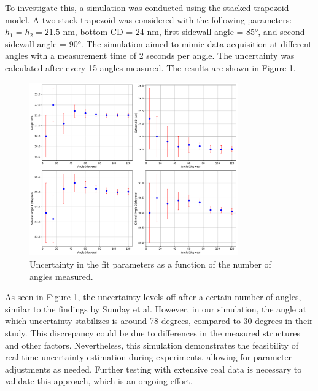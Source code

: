 To investigate this, a simulation was conducted using the stacked trapezoid model. A two-stack 
trapezoid was considered with the following parameters: \( h_{1} = h_{2} = 21.5 \) nm, bottom CD = 24 nm, 
first sidewall angle = 85°, and second sidewall angle = 90°. The simulation aimed to mimic 
data acquisition at different angles with a measurement time of 2 seconds per angle. The uncertainty 
was calculated after every 15 angles measured. The results are shown in Figure \ref{fig:uncertainity}.

\begin{figure}[h]
\centering
\includegraphics[width=0.8\textwidth]{images/uncertainity.png}
\caption{Uncertainty in the fit parameters as a function of the number of angles measured.}
\label{fig:uncertainity}
\end{figure}

As seen in Figure \ref{fig:uncertainity}, the uncertainty levels off after a certain number of angles, similar to the findings by Sunday et al.
However, in our simulation, the angle at which uncertainty stabilizes is around 78 degrees, 
compared to 30 degrees in their study. This discrepancy could be due to differences in the measured
structures and other factors. Nevertheless, this simulation demonstrates the feasibility of real-time 
uncertainty estimation during experiments, allowing for parameter adjustments as needed. Further 
testing with extensive real data is necessary to validate this approach, which is an ongoing effort.
